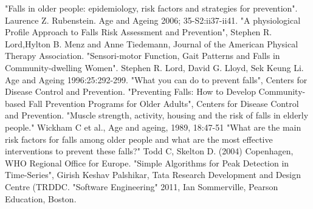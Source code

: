 \begin{thebibliography}{99}
"Falls in older people: epidemiology, risk factors and strategies for prevention". Laurence Z. Rubenstein. Age and Ageing 2006; 35-S2:ii37-ii41.
"A physiological Profile Approach to Falls Risk Assessment and Prevention", Stephen R. Lord,Hylton B. Menz and Anne Tiedemann, Journal of the American Physical Therapy Association. 
"Sensori-motor Function, Gait Patterns and Falls in Community-dwelling Women". Stephen R. Lord, David G. Lloyd, Sek Keung Li. Age and Ageing 1996:25:292-299.
"What you can do to prevent falls", Centers for Disease Control and Prevention.
"Preventing Falls: How to Develop Community-based Fall Prevention Programs for Older Adults", Centers for Disease Control and Prevention.
"Muscle strength, activity, housing and the risk of falls in elderly people." Wickham C et al., Age and ageing, 1989, 18:47-51 
"What are the main risk factors for falls among older people and what are the most effective interventions to prevent these falls?" Todd C, Skelton D. (2004) Copenhagen, WHO Regional Office for Europe. 
"Simple Algorithms for Peak Detection in Time-Series", Girish Keshav Palshikar, Tata Research Development and Design Centre (TRDDC.
"Software Engineering" 2011, Ian Sommerville, Pearson Education, Boston.
\end{thebibliography}
